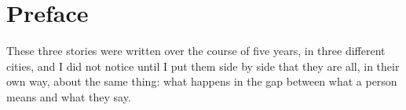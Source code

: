 \chapter{Preface}
These three stories were written over the course of five years, in
three different cities, and I did not notice until I put them side by
side that they are all, in their own way, about the same thing: what
happens in the gap between what a person means and what they say.
